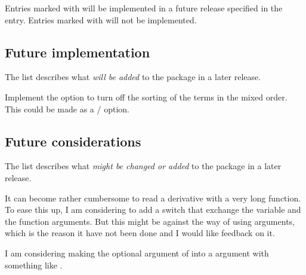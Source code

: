 	Entries marked with \cmark{} will be implemented in a future release specified in the entry. Entries marked with \xmark{} will not be implemented.
	
	\subsection{Future implementation}
	The list describes what \emph{will be added} to the package in a later release.
	\begin{todo}
		\item Implement the option to turn off the sorting of the terms in the mixed order. This could be made as a  /  option. \\
	\end{todo}
	
	
	\subsection{Future considerations}
	The list describes what \emph{might be changed or added} to the package in a later release.
	\begin{consideration}
		\item It can become rather cumbersome to read a derivative with a very long function. To ease this up, I am considering to add a switch that exchange the variable and the function arguments. But this might be against the \latex{} way of using arguments, which is the reason it have not been done and I would like feedback on it. \label{consid:Fun_Var_switch}
		\item I am considering making the optional argument of \macro[index=false]{\slashfrac} into a  argument with something like . \label{consid:slashfrac_opt} \\
	\end{consideration}
	
